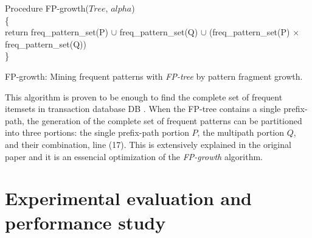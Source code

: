 \documentclass[12pt, a4paper]{article}
\begin{document}
\begin{algorithm}[H]
  \BlankLine
  \BlankLine
  \BlankLine

  Procedure FP-growth($Tree$, $alpha$) \\
  \{\\
    return freq\_pattern\_set(P) $\cup$ freq\_pattern\_set(Q) $\cup$ (freq\_pattern\_set(P) $\times$  freq\_pattern\_set(Q))\\
  \}
  \caption{FP-growth: Mining frequent patterns with \textit{FP-tree} by pattern fragment growth.}
  \label{scol}
\end{algorithm}

This algorithm is proven to be enough to find the complete set of frequent itemsets in transaction database DB \cite{han2000}. When the FP-tree contains a single prefix-path, the generation of the complete set of frequent patterns can be partitioned into three portions: the single prefix-path portion $P$, the multipath portion $Q$, and their combination, line (17). This is extensively explained in the original paper and it is an essencial optimization of the \textit{FP-growth} algorithm.

\section{Experimental evaluation and performance study}
\end{document}
